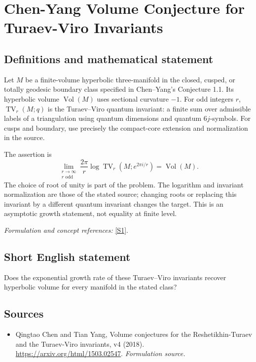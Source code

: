 \documentclass[11pt]{article}
\begin{document}
\section*{\texorpdfstring{Chen-Yang Volume Conjecture for Turaev-Viro Invariants}{Chen-Yang Volume Conjecture for Turaev-Viro Invariants}}\label{431}
\subsection{Definitions and mathematical statement}
Let $M$ be a finite-volume hyperbolic three-manifold in the closed, cusped, or totally geodesic boundary class specified in Chen--Yang's Conjecture 1.1. Its hyperbolic volume $\operatorname{Vol}(M)$ uses sectional curvature $-1$. For odd integers $r$, $\operatorname{TV}_r(M;q)$ is the Turaev--Viro quantum invariant: a finite sum over admissible labels of a triangulation using quantum dimensions and quantum $6j$-symbols. For cusps and boundary, use precisely the compact-core extension and normalization in the source.

The assertion is
\[
 \lim_{\substack{r\to\infty\\r\text{ odd}}}
 \frac{2\pi}{r}\log\operatorname{TV}_r(M;e^{2\pi i/r})
 =\operatorname{Vol}(M).
\]
The choice of root of unity is part of the problem. The logarithm and invariant normalization are those of the stated source; changing roots or replacing this invariant by a different quantum invariant changes the target. This is an asymptotic growth statement, not equality at finite level.
\par\smallskip\textit{Formulation and concept references:} \href{https://arxiv.org/html/1503.02547}{[S1]}.

\subsection{Short English statement}
Does the exponential growth rate of these Turaev--Viro invariants recover hyperbolic volume for every manifold in the stated class?
\subsection{Sources}
\begin{itemize}
\item[S1]Qingtao Chen and Tian Yang, Volume conjectures for the Reshetikhin-Turaev and the Turaev-Viro invariants, v4 (2018).
\url{https://arxiv.org/html/1503.02547}.
\textit{Formulation source.}
\end{itemize}
\end{document}
